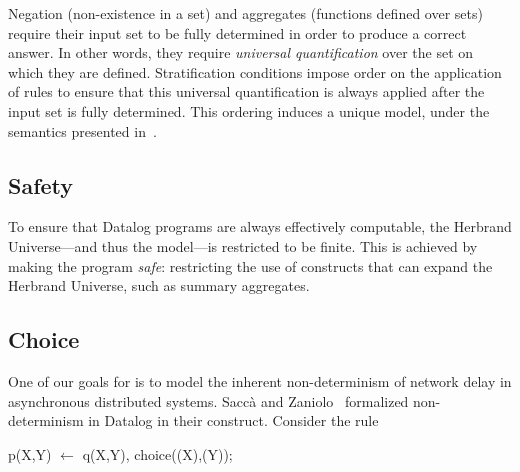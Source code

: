 Negation (non-existence in a set) and aggregates (functions defined over sets)
require their input set to be fully determined in order to produce a correct
answer.  In other words, they require {\em universal quantification} over the
set on which they are defined.  Stratification conditions impose order on the
application of rules to ensure that this universal quantification is always
applied after the input set is fully determined.  This ordering induces a
unique model, under the semantics presented in~\cite{wellfounded}.

\subsection{Safety}

To ensure that Datalog programs are always effectively computable, the Herbrand
Universe---and thus the model---is restricted to be finite.  This is
achieved by making the program {\em safe}: restricting the use of constructs
that can expand the Herbrand Universe, such as summary aggregates.


\subsection{Choice}

One of our goals for \lang is to model the inherent non-determinism of network
delay in asynchronous distributed systems.  Sacc\`{a} and
Zaniolo~\cite{sacca-zaniolo} formalized non-determinism in Datalog in their
 construct.  Consider the rule

\begin{Dedalus}
p(X,Y) \(\leftarrow\) q(X,Y), choice((X),(Y));
\end{Dedalus}


